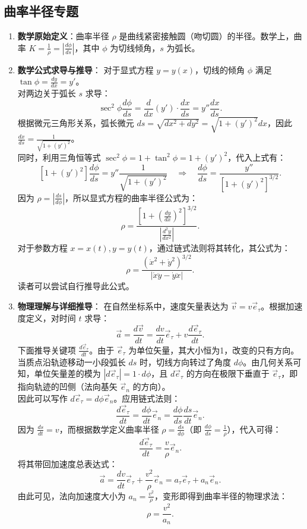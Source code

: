 \subsection{曲率半径专题}
\begin{enumerate}
    \item \textbf{数学原始定义}：曲率半径 $\rho$ 是曲线紧密接触圆（吻切圆）的半径。数学上，曲率 $K = \frac{1}{\rho} = \left|\frac{d\phi}{ds}\right|$，其中 $\phi$ 为切线倾角，$s$ 为弧长。
    \item \textbf{数学公式求导与推导}：
          对于显式方程 $y=y(x)$，切线的倾角 $\phi$ 满足 $\tan\phi = \frac{dy}{dx} = y'$。\\
          对两边关于弧长 $s$ 求导：
          \[
              \sec^2\phi \frac{d\phi}{ds} = \frac{d}{dx}(y') \cdot \frac{dx}{ds} = y'' \frac{dx}{ds}.
          \]
          根据微元三角形关系，弧长微元 $ds = \sqrt{dx^2 + dy^2} = \sqrt{1 + (y')^2}dx$，因此 $\frac{dx}{ds} = \frac{1}{\sqrt{1 + (y')^2}}$。\\
          同时，利用三角恒等式 $\sec^2\phi = 1 + \tan^2\phi = 1 + (y')^2$，代入上式有：
          \[
              [1 + (y')^2] \frac{d\phi}{ds} = y'' \frac{1}{\sqrt{1 + (y')^2}} \quad\Rightarrow\quad \frac{d\phi}{ds} = \frac{y''}{[1 + (y')^2]^{3/2}}.
          \]
          因为 $\rho = \left|\frac{ds}{d\phi}\right|$，所以显式方程的曲率半径公式为：
          \[
              \rho = \frac{\left[1 + \left(\frac{dy}{dx}\right)^2\right]^{3/2}}{\left|\frac{d^2y}{dx^2}\right|}.
          \]
          对于参数方程 $x=x(t), y=y(t)$，通过链式法则将其转化，其公式为：
          \[
              \rho = \frac{(\dot{x}^2 + \dot{y}^2)^{3/2}}{|\dot{x}\ddot{y} - \dot{y}\ddot{x}|}.
          \]
          读者可以尝试自行推导此公式。

    \item \textbf{物理理解与详细推导}：
          在自然坐标系中，速度矢量表达为 $\vec{v} = v \vec{e}_\tau$。根据加速度定义，对时间 $t$ 求导：
          \[
              \vec{a} = \frac{d\vec{v}}{dt} = \frac{dv}{dt}\vec{e}_\tau + v\frac{d\vec{e}_\tau}{dt}.
          \]
          下面推导关键项 $\frac{d\vec{e}_\tau}{dt}$。由于 $\vec{e}_\tau$ 为单位矢量，其大小恒为1，改变的只有方向。当质点沿轨迹移动一小段弧长 $ds$ 时，切线方向转过了角度 $d\phi$。由几何关系可知，单位矢量差的模为 $|d\vec{e}_\tau| = 1 \cdot d\phi$，且 $d\vec{e}_\tau$ 的方向在极限下垂直于 $\vec{e}_\tau$，即指向轨迹的凹侧（法向基矢 $\vec{e}_n$ 的方向）。\\
          因此可以写作 $d\vec{e}_\tau = d\phi \vec{e}_n$。应用链式法则：
          \[
              \frac{d\vec{e}_\tau}{dt} = \frac{d\phi}{dt}\vec{e}_n = \frac{d\phi}{ds}\frac{ds}{dt}\vec{e}_n.
          \]
          因为 $\frac{ds}{dt} = v$，而根据数学定义曲率半径 $\rho = \frac{ds}{d\phi}$（即 $\frac{d\phi}{ds} = \frac{1}{\rho}$），代入可得：
          \[
              \frac{d\vec{e}_\tau}{dt} = \frac{v}{\rho}\vec{e}_n.
          \]
          将其带回加速度总表达式：
          \[
              \vec{a} = \frac{dv}{dt}\vec{e}_\tau + \frac{v^2}{\rho}\vec{e}_n = a_\tau \vec{e}_\tau + a_n \vec{e}_n.
          \]
          由此可见，法向加速度大小为 $a_n = \frac{v^2}{\rho}$，变形即得到曲率半径的物理求法：
          \[
              \rho = \frac{v^2}{a_n}.
          \]
\end{enumerate}

